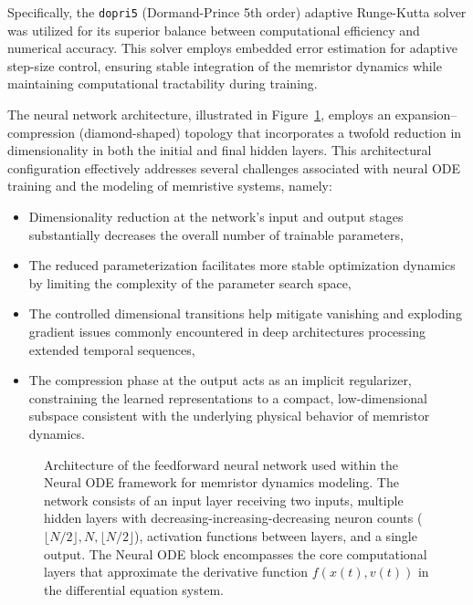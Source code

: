 \documentclass[lettersize,journal]{IEEEtran}
\newcommand{\ua}{v}
\newcommand{\xw}{x}
\begin{document}
Specifically, the \texttt{dopri5} (Dormand-Prince 5th order) adaptive Runge-Kutta solver was utilized for its superior balance between computational efficiency and numerical accuracy. This solver employs embedded error estimation for adaptive step-size control, ensuring stable integration of the memristor dynamics while maintaining computational tractability during training.

The neural network architecture, illustrated in Figure~\ref{fig:nn-arch}, employs an expansion–compression (diamond-shaped) topology that incorporates a twofold reduction in dimensionality in both the initial and final hidden layers. This architectural configuration effectively addresses several challenges associated with neural ODE training and the modeling of memristive systems, namely:
\begin{itemize}
  \item Dimensionality reduction at the network’s input and output stages substantially decreases the overall number of trainable parameters,
  \item The reduced parameterization facilitates more stable optimization dynamics by limiting the complexity of the parameter search space,
  \item The controlled dimensional transitions help mitigate vanishing and exploding gradient issues commonly encountered in deep architectures processing extended temporal sequences,
  \item The compression phase at the output acts as an implicit regularizer, constraining the learned representations to a compact, low-dimensional subspace consistent with the underlying physical behavior of memristor dynamics.
\end{itemize}


\begin{figure}[ht!]
  \centering
  \resizebox{2in}{!}{%
    
  }
  \caption{Architecture of the feedforward neural network used within the Neural ODE framework for memristor dynamics modeling. The network consists of an input layer receiving two inputs, multiple hidden layers with decreasing-increasing-decreasing neuron counts (\(\lfloor N/2 \rfloor, N, \lfloor N/2 \rfloor\)), activation functions between layers, and a single output. The Neural ODE block encompasses the core computational layers that approximate the derivative function \(f(\xw(t), \ua(t))\) in the differential equation system.}

  \label{fig:nn-arch}
\end{figure}
\end{document}
